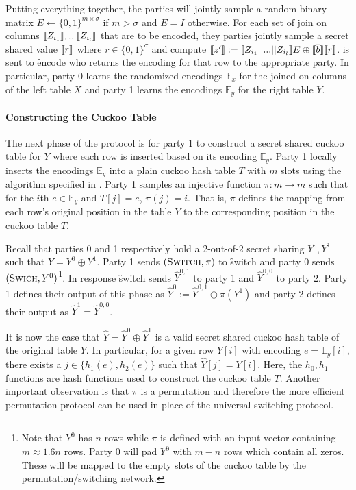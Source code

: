 
Putting everything together, the parties will jointly sample a random binary matrix $E\gets\{0,1\}^{m\times \sigma}$ if $m>\sigma$ and $E=I$ otherwise. For each set of join on columns $\llbracket Z_{i_1}\rrbracket,...\llbracket Z_{i_l}\rrbracket$ that are to be encoded, they parties jointly sample a secret shared value $\llbracket r\rrbracket$ where $r\in\{0,1\}^\sigma$ and compute $\llbracket z'\rrbracket:=\llbracket Z_{i_1}||...||Z_{i_l}\rrbracket E \oplus \llbracket \overline{b}\rrbracket\llbracket r\rrbracket$.  is sent to \f{encode} who returns the encoding for that row to the appropriate party. In particular, party 0 learns the randomized encodings $\mathbb{E}_x$ for the joined on columns of the left table $X$ and party 1 learns the encodings $\mathbb{E}_y$ for the right table $Y$.

\paragraph{Constructing the Cuckoo Table}

The next phase of the protocol is for party 1 to construct a secret shared cuckoo table for $Y$ where each row is inserted based on its encoding $\mathbb{E}_y$. Party 1 locally inserts the encodings $\mathbb{E}_y$ into a plain cuckoo hash table $T$ with $m$ slots using the algorithm specified in . Party 1 samples an injective function $\pi : m\rightarrow m$ such that for the $i$th $e\in \mathbb{E}_y$ and $T[j]=e$, $\pi(j)=i$. That is, $\pi$ defines the mapping from each row's original position in the table $Y$ to the corresponding position in the cuckoo table $T$.

Recall that parties 0 and 1 respectively hold a 2-out-of-2 secret sharing $Y^0,Y^1$ such that $Y=Y^0\oplus Y^1$. 
Party 1 sends $(\textsc{Switch}, \pi)$ to \f{switch} and party 0 sends $(\textsc{Swich}, Y^0)$\footnote{Note that $Y^0$ has $n$ rows while $\pi$ is defined with an input vector containing $m\approx 1.6n$ rows. Party 0 will pad $Y^0$ with $m-n$ rows which contain all zeros. These will be mapped to the empty slots of the cuckoo table by the permutation/switching network.}. In response \f{switch} sends $\hat Y^{0,1}$ to party 1  and $\hat Y^{0,0}$ to party 2. Party 1 defines their output of this phase as $\hat Y^0:=\hat Y^{0,1} \oplus \pi(Y^1)$ and party 2 defines their output as $\hat Y^{1} =\hat Y^{0,0}$.

It is now the case that $\hat Y = \hat Y^0\oplus \hat Y^1$ is a valid secret shared cuckoo hash table of the original table $Y$. In particular, for a given row $Y[i]$ with encoding $e=\mathbb{E}_y[i]$, there exists a $j\in \{h_1(e),h_2(e)\}$ such that  $\hat Y[j] = Y[i]$. Here, the $h_0,h_1$ functions are hash functions used to construct the cuckoo table $T$. Another important observation is that $\pi$ is a permutation and therefore the more efficient permutation protocol can be used in place of the universal switching protocol.

